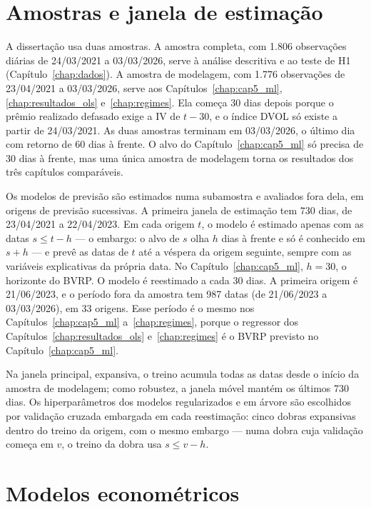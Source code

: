 \section{Amostras e janela de estimação}
\label{sec:amostras}

A dissertação usa duas amostras. A amostra completa, com 1.806 observações
diárias de 24/03/2021 a 03/03/2026, serve à análise descritiva e ao teste de H1
(Capítulo~\ref{chap:dados}). A amostra de modelagem, com 1.776 observações de
23/04/2021 a 03/03/2026, serve aos Capítulos~\ref{chap:cap5_ml},
\ref{chap:resultados_ols} e~\ref{chap:regimes}. Ela começa 30 dias depois porque
o prêmio realizado defasado exige a IV de $t-30$, e o índice DVOL só existe a
partir de 24/03/2021. As duas amostras terminam em 03/03/2026, o último dia
com retorno de 60 dias à frente. O alvo do Capítulo~\ref{chap:cap5_ml} só
precisa de 30 dias à frente, mas uma única amostra de modelagem torna os
resultados dos três capítulos comparáveis.

Os modelos de previsão são estimados numa subamostra e avaliados fora dela, em
origens de previsão sucessivas. A primeira janela de estimação tem 730 dias,
de 23/04/2021 a 22/04/2023. Em cada origem $t$, o modelo é estimado apenas com
as datas $s \le t - h$ --- o embargo: o alvo de $s$ olha $h$ dias à frente e só
é conhecido em $s + h$ --- e prevê as datas de $t$ até a véspera da origem
seguinte, sempre com as variáveis explicativas da própria data. No
Capítulo~\ref{chap:cap5_ml}, $h = 30$, o horizonte do BVRP. O modelo é
reestimado a cada 30 dias. A primeira origem é 21/06/2023, e o período fora da
amostra tem 987 datas (de 21/06/2023 a 03/03/2026), em 33 origens. Esse período
é o mesmo nos Capítulos~\ref{chap:cap5_ml} a~\ref{chap:regimes}, porque o
regressor dos Capítulos~\ref{chap:resultados_ols} e~\ref{chap:regimes} é o BVRP
previsto no Capítulo~\ref{chap:cap5_ml}.

Na janela principal, expansiva, o treino acumula todas as datas desde o início
da amostra de modelagem; como robustez, a janela móvel mantém os últimos 730
dias. Os hiperparâmetros dos modelos regularizados e em árvore são escolhidos
por validação cruzada embargada em cada reestimação: cinco dobras expansivas
dentro do treino da origem, com o mesmo embargo --- numa dobra cuja validação
começa em $v$, o treino da dobra usa $s \le v - h$.

\section{Modelos econométricos}
\label{sec:modelos_referencia}

